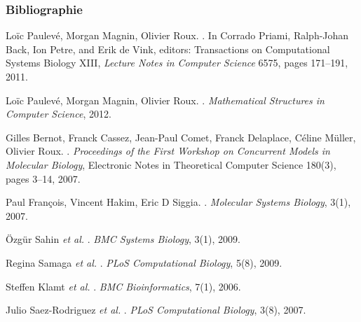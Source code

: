 \begin{frame}[c]
  \frametitle{Bibliographie}

\small
\setlength{\parindent}{-1em}
\setlength{\parskip}{0.5em}

\tcitebullet Loïc Paulevé, Morgan Magnin, Olivier Roux.
.
In Corrado Priami, Ralph-Johan Back, Ion Petre, and Erik de Vink, editors: Transactions on Computational Systems Biology XIII,
\textit{Lecture Notes in Computer Science} 6575, pages 171--191, 2011.

\tcitebullet Loïc Paulevé, Morgan Magnin, Olivier Roux.
.
\textit{Mathematical Structures in Computer Science}, 2012.

\tcitebullet Gilles Bernot, Franck Cassez, Jean-Paul Comet, Franck Delaplace, Céline Müller, Olivier Roux.
.
\textit{Proceedings of the First Workshop on Concurrent Models in Molecular Biology}, Electronic Notes in Theoretical Computer Science 180(3), pages 3--14, 2007.

\tcitebullet Paul François, Vincent Hakim, Eric D Siggia.
.
\textit{Molecular Systems Biology}, 3(1), 2007.

\tcitebullet Özgür Sahin \textit{et al.}
.
\textit{BMC Systems Biology}, 3(1), 2009.

\tcitebullet Regina Samaga \textit{et al.}
.
\textit{PLoS Computational Biology}, 5(8), 2009.

\tcitebullet Steffen Klamt \textit{et al.}
.
\textit{BMC Bioinformatics}, 7(1), 2006.

\tcitebullet Julio Saez-Rodriguez \textit{et al.}
.
\textit{PLoS Computational Biology}, 3(8), 2007.

\end{frame}


